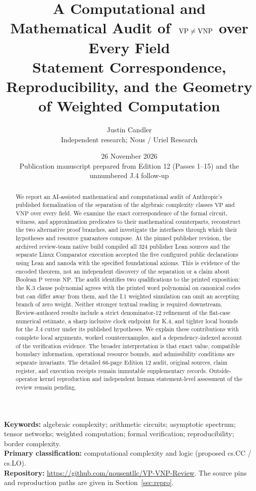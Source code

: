 \documentclass[11pt,letterpaper]{article}
\title{A Computational and Mathematical Audit of\texorpdfstring{\ $\VP\ne\VNP$}{ VP versus VNP} over Every Field\\[4pt]\large Statement Correspondence, Reproducibility, and the Geometry of Weighted Computation}
\author{Justin Candler\\\small Independent research; Nous / Uriel Research}
\date{26 November 2026\\\small Publication manuscript prepared from Edition 12 (Passes 1--15) and the unnumbered J.4 follow-up}
\theoremstyle{definition}\newtheorem{definition}[theorem]{Definition}\newtheorem{example}[theorem]{Example}
\theoremstyle{remark}\newtheorem{remark}[theorem]{Remark}
\newcommand{\VP}{\mathrm{VP}}
\newcommand{\VNP}{\mathrm{VNP}}
\begin{document}
\maketitle
\begin{abstract}
We report an AI-assisted mathematical and computational audit of Anthropic's published formalization of the separation of the algebraic complexity classes $\VP$ and $\VNP$ over every field. We examine the exact correspondence of the formal circuit, witness, and approximation predicates to their mathematical counterparts, reconstruct the two alternative proof branches, and investigate the interfaces through which their hypotheses and resource guarantees compose. At the pinned publisher revision, the archived review-team native build compiled all 324 publisher Lean sources and the separate Linux Comparator execution accepted the five configured public declarations using Lean and nanoda with the specified foundational axioms. This is evidence of the encoded theorem, not an independent discovery of the separation or a claim about Boolean $\mathrm{P}$ versus $\mathrm{NP}$. The audit identifies two qualifications to the printed exposition: the K.3 clause polynomial agrees with the printed word polynomial on canonical codes but can differ away from them, and the I.1 weighted simulation can omit an accepting branch of zero weight. Neither stronger textual reading is required downstream. Review-authored results include a strict denominator-12 refinement of the flat-case numerical estimate, a sharp inclusive clock endpoint for K.4, and tighter local bounds for the J.4 cutter under its published hypotheses. We explain these contributions with complete local arguments, worked counterexamples, and a dependency-indexed account of the verification evidence. The broader interpretation is that exact value, compatible boundary information, operational resource bounds, and admissibility conditions are separate invariants. The detailed 66-page Edition 12 audit, original sources, claim register, and execution receipts remain immutable supplementary records. Outside-operator kernel reproduction and independent human statement-level assessment of the review remain pending.
\end{abstract}
\noindent\textbf{Keywords:} algebraic complexity; arithmetic circuits; asymptotic spectrum; tensor networks; weighted computation; formal verification; reproducibility; border complexity.\\
\noindent\textbf{Primary classification:} computational complexity and logic (proposed cs.CC / cs.LO).\\
\noindent\textbf{Repository:} \url{https://github.com/nousentllc/VP-VNP-Review}. The source pins and reproduction paths are given in Section~\ref{sec:repro}.
\clearpage
\tableofcontents
\clearpage
\end{document}
